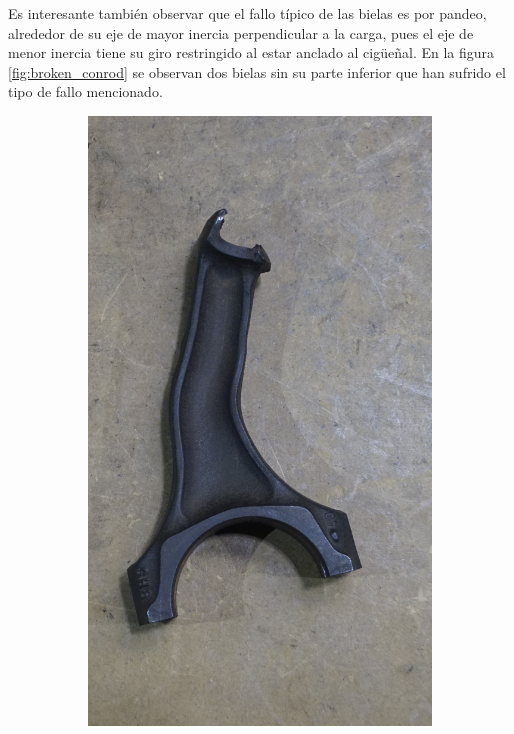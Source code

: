 Es interesante también observar que el fallo típico de las bielas es por pandeo, alrededor de su eje de mayor inercia perpendicular a la carga, pues el eje de menor inercia tiene su giro restringido al estar anclado al cigüeñal. En la figura \ref{fig:broken_conrod} se observan dos bielas sin su parte inferior que han sufrido el tipo de fallo mencionado.

\begin{figure}[H]
	\centering
	\begin{subfigure}[b]{0.45\textwidth}
		\centering
		\includegraphics[width=\linewidth]{Figures/02/m4/conrod_bent.jpg}

\end{subfigure}
\end{figure}
